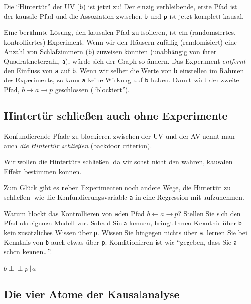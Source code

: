 \documentclass[
  a4paper,
  DIV=11]{scrreprt}
\theoremstyle{definition}
\theoremstyle{remark}
\begin{document}
Die ``Hintertür'' der UV (\texttt{b}) ist jetzt zu! Der einzig
verbleibende, erste Pfad ist der kausale Pfad und die Assoziation
zwischen \texttt{b} und \texttt{p} ist jetzt komplett kausal.

Eine berühmte Lösung, den kausalen Pfad zu isolieren, ist ein
(randomsiertes, kontrolliertes) Experiment. Wenn wir den Häusern
zufällig (randomisiert) eine Anzahl von Schlafzimmern (\texttt{b})
zuweisen könnten (unabhängig von ihrer Quadratmeterzahl, \texttt{a}),
würde sich der Graph so ändern. Das Experiment \emph{entfernt} den
Einfluss von \texttt{a} auf \texttt{b}. Wenn wir selber die Werte von
\texttt{b} einstellen im Rahmen des Experiments, so kann \texttt{a}
keine Wirkung auf \texttt{b} haben. Damit wird der zweite Pfad,
\(b \rightarrow a \rightarrow p\) geschlossen (``blockiert'').

\hypertarget{hintertuxfcr-schlieuxdfen-auch-ohne-experimente}{%
\subsection{Hintertür schließen auch ohne
Experimente}\label{hintertuxfcr-schlieuxdfen-auch-ohne-experimente}}

Konfundierende Pfade zu blockieren zwischen der UV und der AV nennt man
auch \emph{die Hintertür schließen} (backdoor criterion).

Wir wollen die Hintertüre schließen, da wir sonst nicht den wahren,
kausalen Effekt bestimmen können.

Zum Glück gibt es neben Experimenten noch andere Wege, die Hintertür zu
schließen, wie die Konfundierungsvariable \texttt{a} in eine Regression
mit aufzunehmen.

Warum blockt das Kontrollieren von \texttt{a}den Pfad
\(b \leftarrow a \rightarrow p\)? Stellen Sie sich den Pfad als eigenen
Modell vor. Sobald Sie \texttt{a} kennen, bringt Ihnen Kenntnis über
\texttt{b} kein zusätzliches Wissen über \texttt{p}. Wissen Sie hingegen
nichts über \texttt{a}, lernen Sie bei Kenntnis von \texttt{b} auch
etwas über \texttt{p}. Konditionieren ist wie ``gegeben, dass Sie
\texttt{a} schon kennen\ldots{}''.

\(b \perp \!\!\! \perp p \,|\,a\)

\hypertarget{die-vier-atome-der-kausalanalyse}{%
\subsection{Die vier Atome der
Kausalanalyse}\label{die-vier-atome-der-kausalanalyse}}
\end{document}
